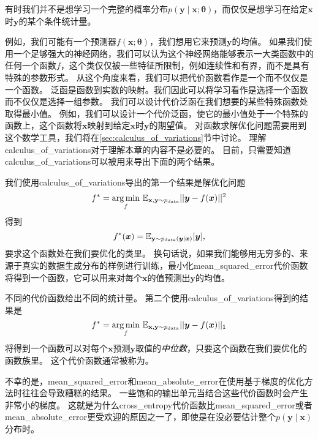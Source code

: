 有时我们并不是想学习一个完整的概率分布$p(\bm{y}\mid\bm{x}; \bm{\theta})$，而仅仅是想学习在给定$\bm{x}$时$\bm{y}$的某个条件统计量。

例如，我们可能有一个预测器$f(\bm{x}; \bm{\theta})$，我们想用它来预测$\bm{y}$的均值。
如果我们使用一个足够强大的神经网络，我们可以认为这个神经网络能够表示一大类函数中的任何一个函数$f$，这个类仅仅被一些特征所限制，例如连续性和有界，而不是具有特殊的参数形式。
从这个角度来看，我们可以把代价函数看作是一个而不仅仅是一个函数。
泛函是函数到实数的映射。我们因此可以将学习看作是选择一个函数而不仅仅是选择一组参数。
我们可以设计代价泛函在我们想要的某些特殊函数处取得最小值。
例如，我们可以设计一个代价泛函，使它的最小值处于一个特殊的函数上，这个函数将$\bm{x}$映射到给定$\bm{x}$时$\bm{y}$的期望值。
对函数求解优化问题需要用到这个数学工具，我们将在\ref{sec:calculus_of_variations}节中讨论。
理解\gls{calculus_of_variations}对于理解本章的内容不是必要的。
目前，只需要知道\gls{calculus_of_variations}可以被用来导出下面的两个结果。


我们使用\gls{calculus_of_variations}导出的第一个结果是解优化问题
\begin{equation}
f^* = \underset{f}{\arg\min}  \ \mathbb{E}_{\mathbf{x}, \mathbf{y} \sim  p_\text{data}} ||\bm{y}-f(\bm{x})||^2
\end{equation}
得到
\begin{equation}
f^*(\bm{x}) = \mathbb{E}_{\mathbf{y}\sim p_\text{data}(\bm{y}|\bm{x})} [\bm{y}],
\end{equation}
要求这个函数处在我们要优化的类里。
换句话说，如果我们能够用无穷多的、来源于真实的数据生成分布的样例进行训练，最小化\gls{mean_squared_error}代价函数将得到一个函数，它可以用来对每个$\bm{x}$的值预测出$\bm{y}$的均值。

不同的代价函数给出不同的统计量。
第二个使用\gls{calculus_of_variations}得到的结果是
\begin{equation}
f^* = \underset{f}{\arg\min} \ \mathbb{E}_{\mathbf{x}, \mathbf{y} \sim  p_\text{data}} ||\bm{y} - f(\bm{x})||_1
\end{equation}
将得到一个函数可以对每个$\bm{x}$预测$\bm{y}$取值的\emph{中位数}，只要这个函数在我们要优化的函数族里。
这个代价函数通常被称为。

不幸的是，\gls{mean_squared_error}和\gls{mean_absolute_error}在使用基于梯度的优化方法时往往会导致糟糕的结果。
一些饱和的输出单元当结合这些代价函数时会产生非常小的梯度。
这就是为什么\gls{cross_entropy}代价函数比\gls{mean_squared_error}或者\gls{mean_absolute_error}更受欢迎的原因之一了，即使是在没必要估计整个$p(\bm{y}\mid\bm{x})$分布时。


